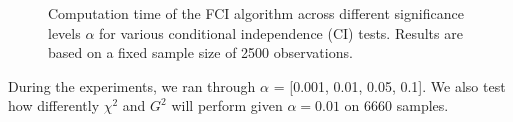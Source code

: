 \documentclass[main.tex]{subfiles}
\begin{document}
\begin{figure}[h]
\begin{minipage}{0.48\textwidth}
        \caption{Computation time of the FCI algorithm across different significance levels $\alpha$ for various conditional independence (CI) tests. Results are based on a fixed sample size of 2500 observations.}
        \label{fig:fci_runtime_vs_alpha}
    \end{minipage}
\end{figure}

During the experiments, we ran through $\alpha$ = [0.001, 0.01, 0.05, 0.1]. We also test how differently $\chi^2$ and $G^2$ will perform given $\alpha = 0.01$ on 6660 samples. 

\end{document}
